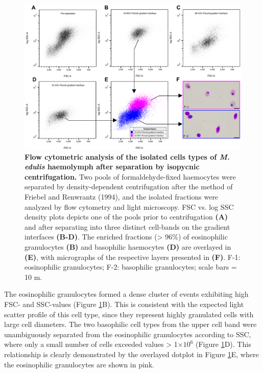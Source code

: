 \begin{figure}[H]
    \centering
    \includegraphics[width=1.0\textwidth]{figures/Method development/PERCOLL SEP II.pdf}
    \caption{\textbf{Flow cytometric analysis of the isolated cells types of \emph{M. edulis} haemolymph after separation by isopycnic centrifugation.} Two pools of formaldehyde-fixed haemocytes were separated by density-dependent centrifugation after the method of Friebel and Renwrantz (1994), and the isolated fractions were analyzed by flow cytometry and light microscopy. FSC vs. log SSC density plots depicts one of the pools prior to centrifugation \textbf{(A)} and after separating into three distinct cell-bands on the gradient interfaces \textbf{(B-D)}. The enriched fractions (> 96\%) of eosinophilic granulocytes \textbf{(B)} and basophilic haemocytes \textbf{(D)} are overlayed in \textbf{(E)}, with micrographs of the respective layers presented in \textbf{(F)}. F-1: eosinophilic granulocytes; F-2: basophilic granulocytes; scale bars = 10 \micro m. }
    \label{fig:Percoll-dotplots}
\end{figure}

The eosinophilic granulocytes formed a dense cluster of events exhibiting high FSC- and SSC-values (Figure \ref{fig:Percoll-dotplots}B). This is consistent with the expected light scatter profile of this cell type, since they represent highly granulated cells with large cell diameters. The two basophilic cell types from the upper cell band were unambiguously separated from the eosinophilic granulocytes according to SSC, where only a small number of cells exceeded values > 1$\times 10^{6}$ (Figure \ref{fig:Percoll-dotplots}D). This relationship is clearly demonstrated by the overlayed dotplot in Figure \ref{fig:Percoll-dotplots}E, where the eosinophilic granulocytes are shown in pink.

